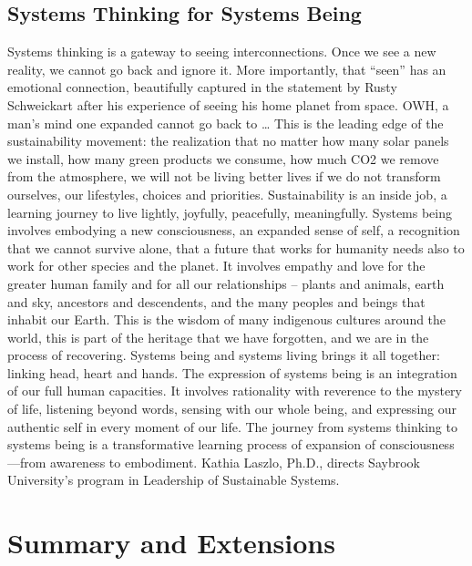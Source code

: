 \subsection{Systems Thinking for Systems Being}

Systems thinking is a gateway to seeing interconnections. Once we see a new reality, we cannot go back and ignore it. More importantly, that “seen” has an emotional connection, beautifully captured in the statement by Rusty Schweickart after his experience of seeing his home planet from space. OWH, a man’s mind one expanded cannot go back to …
This is the leading edge of the sustainability movement: the realization that no matter how many solar panels we install, how many green products we consume, how much CO2 we remove from the atmosphere, we will not be living better lives if we do not transform ourselves, our lifestyles, choices and priorities. Sustainability is an inside job, a learning journey to live lightly, joyfully, peacefully, meaningfully.
Systems being involves embodying a new consciousness, an expanded sense of self, a recognition that we cannot survive alone, that a future that works for humanity needs also to work for other species and the planet. It involves empathy and love for the greater human family and for all our relationships – plants and animals, earth and sky, ancestors and descendents, and the many peoples and beings that inhabit our Earth. This is the wisdom of many indigenous cultures around the world, this is part of the heritage that we have forgotten, and we are in the process of recovering.
Systems being and systems living brings it all together: linking head, heart and hands. The expression of systems being is an integration of our full human capacities. It involves rationality with reverence to the mystery of life, listening beyond words, sensing with our whole being, and expressing our authentic self in every moment of our life. The journey from systems thinking to systems being is a transformative learning process of expansion of consciousness—from awareness to embodiment. Kathia Laszlo, Ph.D., directs Saybrook University's program in Leadership of Sustainable Systems.


\section{Summary and Extensions}

